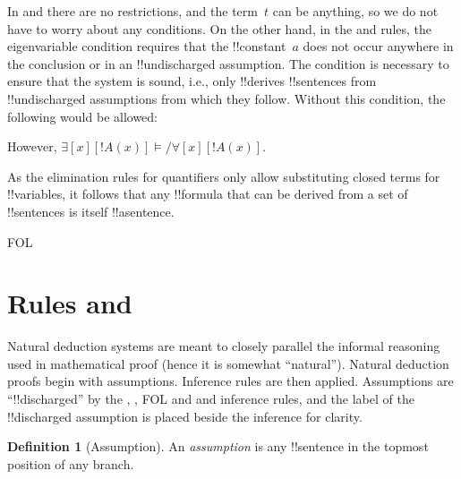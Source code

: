 \documentclass[10pt,a4paper]{article}
\theoremstyle{plain}
\theoremstyle{definition}
\newtheorem{defn}[thm]{Definition}
\theoremstyle{remark}
\newenvironment{explain}{}{}
\newcommand*{\olfileid}[3]{}
\newcommand*{\olsection}[1]{\section*{#1}}
\providecommand{\AxiomC}[1]{}
\providecommand{\UnaryInfC}[1]{}
\providecommand{\BinaryInfC}[1]{}
\providecommand{\RightLabel}[1]{}
\newenvironment{prooftree}{}{}
\providecommand{\lif}{\mathbin{\rightarrow}}
\providecommand{\lforall}{\mathord{\forall}}
\providecommand{\lexists}{\mathord{\exists}}
\providecommand{\Entails}{\mathrel{\models}}
\providecommand{\iftag}[1]{#1}
\providecommand{\Elim}[1]{}
\providecommand{\Intro}[1]{}
\providecommand{\Discharge}{\mathrm{Dis}}
\providecommand{\Intro}{\mathrm{I}}
\providecommand{\iftag}{}
\begin{document}
\begin{explain}
In \Intro{\lexists} and \Elim{\lforall} there are no restrictions, and
the term~$t$ can be anything, so we do not have to worry about any
conditions. On the other hand, in the \Elim{\lexists} and
\Intro{\lforall} rules, the eigenvariable condition requires that the
!!{constant}~$a$ does not occur anywhere in the conclusion or in an
!!{undischarged} assumption. The condition is necessary to ensure that
the system is sound, i.e., only !!{derive}s !!{sentence}s from
!!{undischarged} assumptions from which they follow. Without this
condition, the following would be allowed:
\begin{prooftree}
  \AxiomC{$\lexists[x][!A(x)]$}
  \AxiomC{$\Discharge{!A(a)}{1}$}
  \RightLabel{*\Intro{\lforall}}
  \UnaryInfC{$\lforall[x][!A(x)]$}
  \RightLabel{\Elim{\lexists}}
  \BinaryInfC{$\lforall[x][!A(x)]$}
\end{prooftree}
However, $\lexists[x][!A(x)] \Entails/ \lforall[x][!A(x)]$.

As the elimination rules for quantifiers only allow substituting
closed terms for !!{variable}s, it follows that any !!{formula} that
can be derived from a set of !!{sentence}s is itself !!a{sentence}.
\end{explain}






\iftag{FOL}
      {\olfileid{fol}{ntd}{rul}}
      {\olfileid{pl}{ntd}{rul}}

\olsection{Rules and }

\begin{explain}
Natural deduction systems are meant to closely parallel the informal
reasoning used in mathematical proof (hence it is somewhat
``natural''). Natural deduction proofs begin with assumptions.
Inference rules are then applied. Assumptions are ``!!{discharged}''
by the \Intro{\lnot}, \Intro{\lif}, \iftag{FOL}{\Elim{\lor} and
  \Elim{\lexists}}{ and \Elim{\lor}} inference rules, and the label of
the !!{discharged} assumption is placed beside the inference for
clarity.
\end{explain}

\begin{defn}[Assumption]
An \emph{assumption} is any !!{sentence}
in the topmost position of any branch.
\end{defn}
\end{document}
